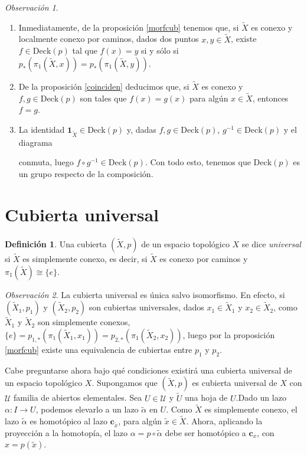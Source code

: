 \documentclass[12pt,a4paper]{book}
\theoremstyle{definition} \newtheorem{defn}[thm]{Definición}
\theoremstyle{definition} \newtheorem{ejemplo}[thm]{Ejemplo}
\theoremstyle{definition} \newtheorem{ejercicio}[thm]{Ejercicio}
\theoremstyle{remark} \newtheorem*{obs}{Observación}
\def\id{\mathbf{1}}
\def\cc{\mathbf{c}}
\def\gf{\pi_1}
\def\XX{\tilde{X}}
\def\xx{\tilde{x}}
\def\DD{\mathrm{Deck}}
\begin{document}
\begin{obs}\leavevmode
  \begin{enumerate}
    \item Inmediatamente, de la proposición \ref{morfcub} tenemos que, si $\XX$ es conexo y localmente conexo por caminos, dados dos puntos $x,y\in \XX$, existe $f\in \DD(p)$ tal que $f(x)=y$ si y sólo si $p_{*}(\gf(\XX,x))=p_{*}(\gf(\XX,y))$.
   \item De la proposición \ref{coinciden} deducimos que, si $\XX$ es conexo y $f,g\in \DD(p)$ son tales que $f(x)=g(x)$ para algún $x\in\XX$, entonces $f=g$. 
   \item La identidad $\id_{\XX}\in \DD(p)$ y, dadas $f,g\in \DD(p)$, $g^{-1}\in \DD(p)$ y el diagrama
     \begin{center}
     \end{center}
     conmuta, luego $f\circ g^{-1} \in \DD(p)$. Con todo esto, tenemos que $\DD(p)$ es un grupo respecto de la composición.
 \end{enumerate}
\end{obs}

\section{Cubierta universal}
\begin{defn}
  Una cubierta $(\XX,p)$ de un espacio topológico $X$ se dice \emph{universal} si $\XX$ es simplemente conexo, es decir, si $\XX$ es conexo por caminos y $\gf(\XX)\cong\{e\}$.
\end{defn}

\begin{obs}
  La cubierta universal es única salvo isomorfismo. En efecto, si $(\XX_1,p_1)$ y $(\XX_2,p_2)$ son cubiertas universales, dados $x_1\in \XX_1$ y $x_2 \in \XX_2$, como $\XX_1$ y $\XX_2$ son simplemente conexos, $\{e\}=p_{1,*}(\gf(\XX_1,x_1))=p_{2,*}(\gf(\XX_2,x_2))$, luego por la proposición \ref{morfcub} existe una equivalencia de cubiertas entre $p_1$ y $p_2$.
\end{obs}

Cabe preguntarse ahora bajo qué condiciones existirá una cubierta universal de un espacio topológico $X$. Supongamos que $(\XX,p)$ es cubierta universal de $X$ con $\mathcal{U}$ familia de abiertos elementales. Sea $U\in \mathcal{U}$ y $\tilde{U}$ una hoja de $U$.Dado un lazo $\alpha:I\rightarrow U$, podemos elevarlo a un lazo $\tilde{\alpha}$ en $U$. Como $\XX$ es simplemente conexo, el lazo $\tilde{\alpha}$ es homotópico al lazo $\cc_{\xx}$, para algún $\xx\in \XX$. Ahora, aplicando la proyección a la homotopía, el lazo $\alpha=p\circ \tilde{\alpha}$ debe ser homotópico a $\cc_{x}$, con $x=p(\xx)$.
\end{document}
